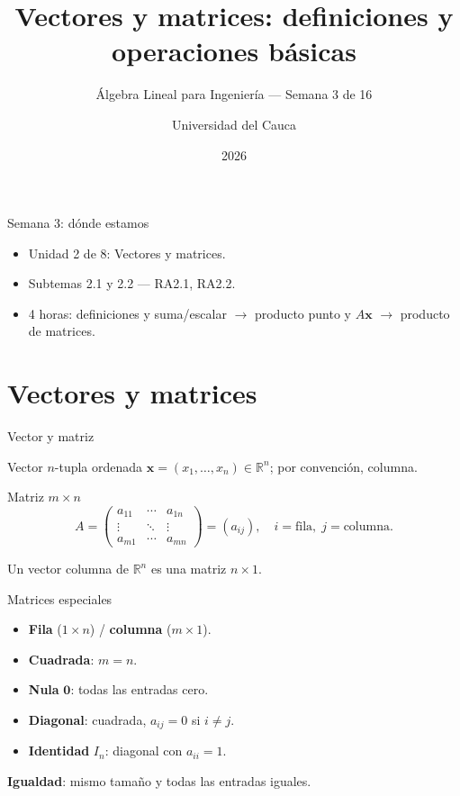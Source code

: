 \documentclass[11pt]{beamer}
\title[Semana 3: Vectores y matrices]{Vectores y matrices: definiciones y operaciones básicas}
\subtitle{Álgebra Lineal para Ingeniería --- Semana 3 de 16}
\author{Universidad del Cauca}
\date{2026}
\newcommand{\R}{\mathbb{R}}
\newcommand{\vv}[1]{\mathbf{#1}}
\begin{document}
\begin{frame}
  \titlepage
\end{frame}

\begin{frame}{Semana 3: dónde estamos}
  \begin{itemize}
    \item Unidad 2 de 8: Vectores y matrices.
    \item Subtemas 2.1 y 2.2 --- RA2.1, RA2.2.
    \item 4 horas: definiciones y suma/escalar $\to$ producto punto y $A\vv{x}$ $\to$ producto de
          matrices.
  \end{itemize}
  \tableofcontents
\end{frame}

\section{Vectores y matrices}

\begin{frame}{Vector y matriz}
  \begin{block}{Vector}
    $n$-tupla ordenada $\vv{x}=(x_1,\ldots,x_n)\in\R^n$; por convención, columna.
  \end{block}
  \begin{block}{Matriz $m\times n$}
    \[
      A = \begin{pmatrix}
        a_{11} & \cdots & a_{1n} \\
        \vdots & \ddots & \vdots \\
        a_{m1} & \cdots & a_{mn}
      \end{pmatrix} = (a_{ij}), \quad i=\text{fila},\; j=\text{columna}.
    \]
  \end{block}
  Un vector columna de $\R^n$ es una matriz $n\times 1$.
\end{frame}

\begin{frame}{Matrices especiales}
  \begin{itemize}
    \item \textbf{Fila} ($1\times n$) / \textbf{columna} ($m\times 1$).
    \item \textbf{Cuadrada}: $m=n$.
    \item \textbf{Nula} $\vv{0}$: todas las entradas cero.
    \item \textbf{Diagonal}: cuadrada, $a_{ij}=0$ si $i\neq j$.
    \item \textbf{Identidad} $I_n$: diagonal con $a_{ii}=1$.
  \end{itemize}
  \vfill
  \textbf{Igualdad}: mismo tamaño y todas las entradas iguales.
\end{frame}
\end{document}
